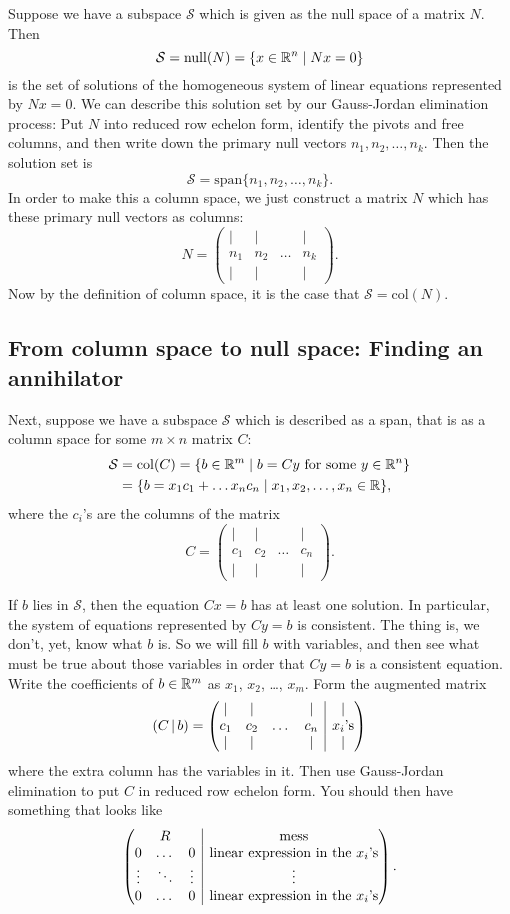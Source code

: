 \documentclass[elementsmain.tex]{subfiles}
\begin{document}
Suppose we have a subspace $\mathcal{S}$ which is given as the null space of a matrix $N$. Then 
\[
\mathcal{S} = \mathrm{null}(N) = \{ x \in \mathbb{R}^n \mid Nx = 0 \}
\]
is the set of solutions of the homogeneous system of linear equations represented by $Nx=0$. We can describe this solution set by our Gauss-Jordan elimination process: Put $N$ into reduced row echelon form, identify the pivots and free columns, and then write down the primary null vectors $n_1, n_2, \ldots, n_k$. Then the solution set is
\[
\mathcal{S} = \mathrm{span}\{ n_1, n_2, \ldots, n_k\}.
\]
In order to make this a column space, we just construct a matrix $N$ which has these primary null vectors as columns:
\[
N = \begin{pmatrix} | & | &  & | \\ n_1 & n_2 & \dots & n_k \\ | & | &  & | \end{pmatrix}.
\]
Now by the definition of column space, it is the case that $\mathcal{S} = \mathrm{col}(N)$.

\subsection*{From column space to null space: Finding an annihilator}

Next, suppose we have a subspace $\mathcal{S}$ which is described as a span, that is as a column space for some $m\times n$ matrix $C$:
\[
\begin{split}
\mathcal{S} & = \mathrm{col}(C) = \{ b  \in \mathbb{R}^m \mid \text{$b = Cy$ for some $y \in \mathbb{R}^n$} \} \\
 & = \{ b = x_1 c_1 + \dots x_n c_n \mid x_1, x_2, \dots, x_n \in \mathbb{R}  \},
\end{split}
\]
where the $c_i$'s are the columns of the matrix
\[
C = \begin{pmatrix} | & | &  & | \\ c_1 & c_2 & \dots & c_n \\ | & | &  & | \end{pmatrix}.
\]

If $b$ lies in $\mathcal{S}$, then the equation $Cx=b$ has at least one solution. In particular, the system of equations represented by $Cy=b$ is consistent. The thing is, we don't, yet, know what $b$ is. So we will fill $b$ with variables, and then see what must be true about those variables in order that $Cy=b$ is a consistent equation. Write the coefficients of $b \in \mathbb{R}^m$ as $x_1$, $x_2$, \dots, $x_m$. 
Form the augmented matrix
\[
(C\,|\,b) = \augmatrix{cccc}{| & | &  & | & | \\ c_1 & c_2 & \dots & c_n & \text{$x_i$'s} \\ | & | &  & | & |}
\]
where the extra column has the variables in it. Then use Gauss-Jordan elimination to put $C$ in reduced row echelon form. You should then have something that looks like
\[
\augmatrix{ccc}{  & R & &  \text{mess} \\ 0 & \dots & 0  & \text{linear expression in the $x_i$'s} \\  \vdots & \ddots & \vdots & \vdots  \\
0 & \dots & 0   & \text{linear expression in the $x_i$'s}}.
\]
\end{document}
